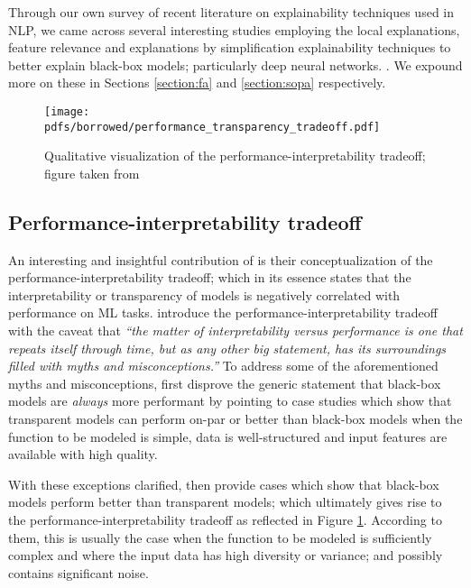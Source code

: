 Through our own survey of recent literature on explainability techniques used in
NLP, we came across several interesting studies employing the local
explanations, feature relevance and explanations by simplification
explainability techniques to better explain black-box models; particularly deep
neural networks.
\citep{schwartz2018sopa,peng2018rational,suresh-etal-2019-distilling,wang2019state,jiang2020cold}.
We expound more on these in Sections \ref{section:fa} and \ref{section:sopa}
respectively.

\begin{figure}[t]
  \centering
  \texttt{[image: pdfs/borrowed/performance\_transparency\_tradeoff.pdf]}
  \caption{Qualitative visualization of the performance-interpretability tradeoff;
    figure taken from \citet{arrieta2020explainable}}
  \label{fig:performance_interpretability_tradeoff}
\end{figure}

\subsection{Performance-interpretability tradeoff}

An interesting and insightful contribution of \citet{arrieta2020explainable} is
their conceptualization of the performance-interpretability tradeoff; which in
its essence states that the interpretability or transparency of models is
negatively correlated with performance on ML tasks. \citet[Page 18, Section
5.1]{arrieta2020explainable} introduce the performance-interpretability tradeoff
with the caveat that \textit{``the matter of interpretability versus performance
  is one that repeats itself through time, but as any other big statement, has
  its surroundings filled with myths and misconceptions.''} To address some of
the aforementioned myths and misconceptions, \citet{arrieta2020explainable}
first disprove the generic statement that black-box models are
\textit{always} more performant by pointing to case studies which show that
transparent models can perform on-par or better than black-box models when the
function to be modeled is simple, data is well-structured and input
features are available with high quality.

With these exceptions clarified, \citet{arrieta2020explainable} then provide cases
which show that black-box models perform better than transparent models; which
ultimately gives rise to the performance-interpretability tradeoff as
reflected in Figure \ref{fig:performance_interpretability_tradeoff}. According to
them, this is usually the case when the function to be modeled is sufficiently
complex and where the input data has high diversity or variance; and possibly
contains significant noise.

